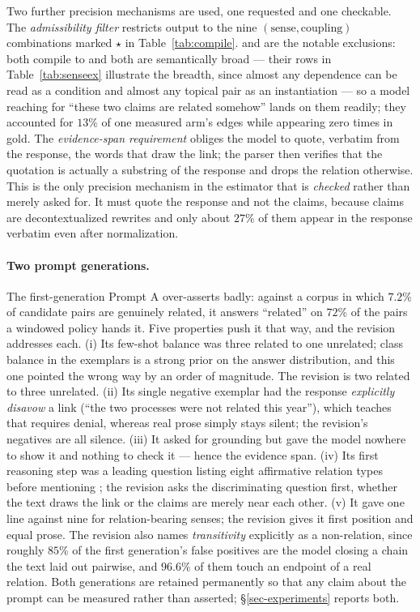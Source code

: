 Two further precision mechanisms are used, one requested and one checkable. The \emph{admissibility
filter} restricts output to the nine $(\text{sense},\text{coupling})$ combinations marked $\star$ in
Table~\ref{tab:compile}.  and  are the notable exclusions:
both compile to \ent{} and both are semantically broad --- their rows in
Table~\ref{tab:senseex} illustrate the breadth, since almost any dependence can be read as a
condition and almost any topical pair as an instantiation --- so a model reaching for ``these two
claims are related somehow'' lands on them readily; they accounted for $13\%$ of one measured arm's
edges while appearing zero times in gold. The \emph{evidence-span requirement} obliges the model to
quote, verbatim from the response, the words that draw the link; the parser then verifies that the
quotation is actually a substring of the response and drops the relation otherwise. This is the only
precision mechanism in the estimator that is \emph{checked} rather than merely asked for. It must
quote the response and not the claims, because claims are decontextualized rewrites and only about
$27\%$ of them appear in the response verbatim even after normalization.

\paragraph{Two prompt generations.} The first-generation Prompt A over-asserts badly: against a
corpus in which $7.2\%$ of candidate pairs are genuinely related, it answers ``related'' on $72\%$ of
the pairs a windowed policy hands it. Five properties push it that way, and the revision addresses
each. (i) Its few-shot balance was three related to one unrelated; class balance in the exemplars is
a strong prior on the answer distribution, and this one pointed the wrong way by an order of
magnitude. The revision is two related to three unrelated. (ii) Its single negative exemplar had the
response \emph{explicitly disavow} a link (``the two processes were not related this year''), which
teaches that  requires denial, whereas real prose simply stays silent; the revision's
negatives are all silence. (iii) It asked for grounding but gave the model nowhere to show it and
nothing to check it --- hence the evidence span. (iv) Its first reasoning step was a leading question
listing eight affirmative relation types before mentioning ; the revision asks the
discriminating question first, whether the text draws the link or the claims are merely near each
other. (v) It gave  one line against nine for relation-bearing senses; the revision
gives it first position and equal prose. The revision also names \emph{transitivity} explicitly as a
non-relation, since roughly $85\%$ of the first generation's false positives are the model closing a
chain the text laid out pairwise, and $96.6\%$ of them touch an endpoint of a real relation. Both
generations are retained permanently so that any claim about the prompt can be measured rather than
asserted; \S\ref{sec-experiments} reports both.

